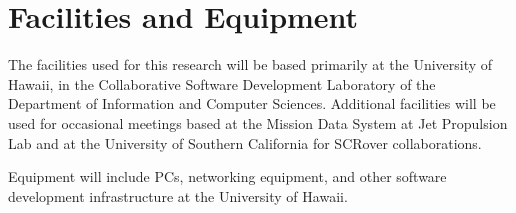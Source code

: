 
\section{Facilities and Equipment}

The facilities used for this research will be based primarily at the
University of Hawaii, in the Collaborative Software Development Laboratory
of the Department of Information and Computer Sciences.  Additional
facilities will be used for occasional meetings based at the Mission Data
System at Jet Propulsion Lab and at the University of Southern California
for SCRover collaborations.

Equipment will include PCs, networking equipment, and other software
development infrastructure at the University of Hawaii. 
